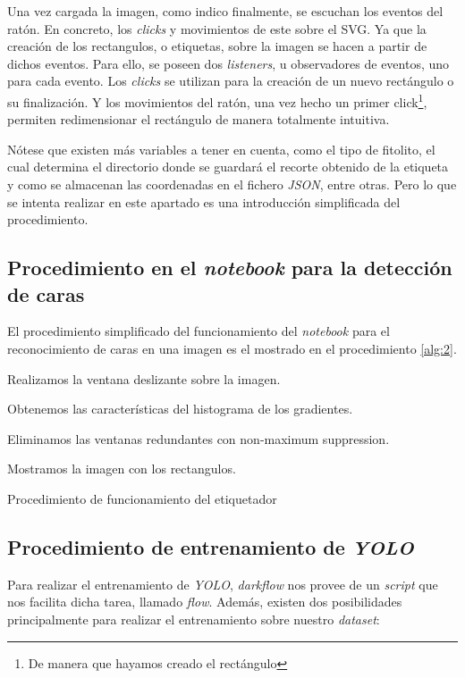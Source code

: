 Una vez cargada la imagen, como indico finalmente, se escuchan los eventos del ratón. En concreto, los \textit{clicks} y movimientos de este sobre el SVG. Ya que la creación de los rectangulos, o etiquetas, sobre la imagen se hacen a partir de dichos eventos. Para ello, se poseen dos \textit{listeners}, u observadores de eventos, uno para cada evento. Los \textit{clicks} se utilizan para la creación de un nuevo rectángulo o su finalización. Y los movimientos del ratón, una vez hecho un primer click\footnote{De manera que hayamos creado el rectángulo}, permiten redimensionar el rectángulo de manera totalmente intuitiva.

Nótese que existen más variables a tener en cuenta, como el tipo de fitolito, el cual determina el directorio donde se guardará el recorte obtenido de la etiqueta y como se almacenan las coordenadas en el fichero \textit{JSON}, entre otras. Pero lo que se intenta realizar en este apartado es una introducción simplificada del procedimiento.

\subsection{Procedimiento en el \textit{notebook} para la detección de caras}

El procedimiento simplificado del funcionamiento del \textit{notebook} para el reconocimiento de caras en una imagen es el mostrado en el procedimiento \ref{alg:2}.

\begin{algorithm}
    Realizamos la ventana deslizante sobre la imagen.
    
    Obtenemos las características del histograma de los gradientes.

    Eliminamos las ventanas redundantes con non-maximum suppression.

    Mostramos la imagen con los rectangulos.
    \caption{Procedimiento de funcionamiento del etiquetador}
    \label{alg:2}
\end{algorithm}

\subsection{Procedimiento de entrenamiento de \textit{YOLO}}

Para realizar el entrenamiento de \textit{YOLO}, \textit{darkflow} nos provee de un \textit{script} que nos facilita dicha tarea, llamado \textit{flow}. Además, existen dos posibilidades principalmente para realizar el entrenamiento sobre nuestro \textit{dataset}:

